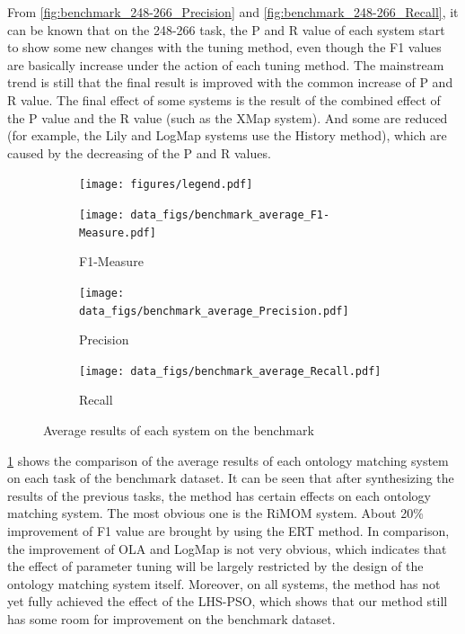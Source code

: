 \documentclass[twoside]{article}
\begin{document}
From \ref{fig:benchmark_248-266_Precision} and \ref{fig:benchmark_248-266_Recall}, it can be known that on the 248-266 task, the P and R value of each system start to show some new changes with the tuning method, even though the F1 values are basically increase under the action of each tuning method.
The mainstream trend is still that the final result is improved with the common increase of P and R value. The final effect of some systems is the result of the combined effect of the P value and the R value (such as the XMap system). And some are reduced (for example, the Lily and LogMap systems use the History method), which are caused by the decreasing of the P and R values.

\begin{figure}[htb!]\centering
\begin{subfigure}{\textwidth}
	\centering
\texttt{[image: figures/legend.pdf]}
\end{subfigure}
\begin{subfigure}{0.3\textwidth}
	\centering
\texttt{[image: data\_figs/benchmark\_average\_F1-Measure.pdf]}
\caption{F1-Measure}
\label{fig:benchmark_average_F1-Measure}
\end{subfigure}
\begin{subfigure}{0.3\textwidth}
	\centering
\texttt{[image: data\_figs/benchmark\_average\_Precision.pdf]}
\caption{Precision}
\label{fig:benchmark_average_Precision}
\end{subfigure}
\begin{subfigure}{0.3\textwidth}
	\centering
\texttt{[image: data\_figs/benchmark\_average\_Recall.pdf]}
\caption{Recall}
\label{fig:benchmark_average_Recall}
\end{subfigure}
\caption{Average results of each system on the benchmark}
\end{figure}

\ref{fig:benchmark_average_F1-Measure} shows the comparison of the average results of each ontology matching system on each task of the benchmark dataset. It can be seen that after synthesizing the results of the previous tasks, the method has certain effects on each ontology matching system. The most obvious one is the RiMOM system. About 20\% improvement of F1 value are brought by using the ERT method.
In comparison, the improvement of OLA and LogMap is not very obvious, which indicates that the effect of parameter tuning will be largely restricted by the design of the ontology matching system itself.
Moreover, on all systems, the method has not yet fully achieved the effect of the LHS-PSO, which shows that our method still has some room for improvement on the benchmark dataset.
\end{document}

